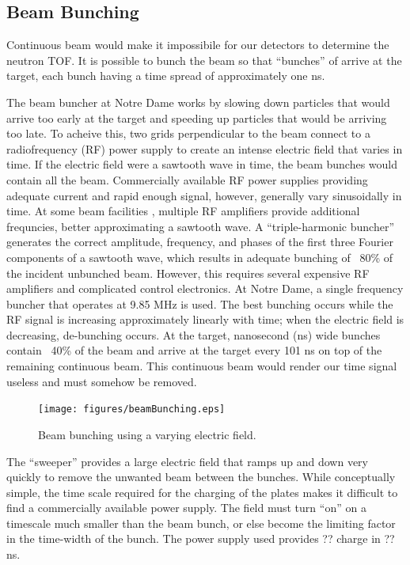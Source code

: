 \subsection{Beam Bunching}

Continuous beam would make it impossibile for our detectors to determine the neutron TOF.  It is possible to bunch the beam so that ``bunches'' of  arrive at the target, each bunch having a time spread of approximately one ns.  

The beam buncher at Notre Dame works by slowing down particles that would arrive too early at the target and speeding up particles that would be arriving too late.  To acheive this, two grids perpendicular to the beam connect to a radiofrequency (RF) power supply to create an intense electric field that varies in time.  If the electric field were a sawtooth wave in time, the beam bunches would contain all the beam.  Commercially available RF power supplies providing adequate current and rapid enough signal, however, generally vary sinusoidally in time.  At some beam facilities \cite{LynchBunching}, multiple RF amplifiers provide additional frequncies, better approximating a sawtooth wave.  A ``triple-harmonic buncher'' \cite{LynchBunching} generates the correct amplitude, frequency, and phases of the first three Fourier components of a sawtooth wave, which results in adequate bunching of ~80\% of the incident unbunched beam.  However, this requires several expensive RF amplifiers and complicated control electronics.  At Notre Dame, a single frequency buncher that operates at 9.85 MHz is used.  The best bunching occurs while the RF signal is increasing approximately linearly with time; when the electric field is decreasing, de-bunching occurs.  At the target, nanosecond (ns) wide bunches contain ~40\% of the beam and arrive at the target every 101 ns on top of the remaining continuous beam.  This continuous beam would render our time signal useless and must somehow be removed.

\begin{figure}[htp]
\centering
\texttt{[image: figures/beamBunching.eps]}
\label{fig:bunching}
\caption{Beam bunching using a varying electric field.}
\end{figure}

The ``sweeper'' provides a large electric field that ramps up and down very quickly to remove the unwanted beam between the bunches.  While conceptually simple, the time scale required for the charging of the plates makes it difficult to find a commercially available power supply.  The field must turn ``on'' on a timescale much smaller than the beam bunch, or else become the limiting factor in the time-width of the bunch.  The power supply used provides ?? charge in ?? ns.

